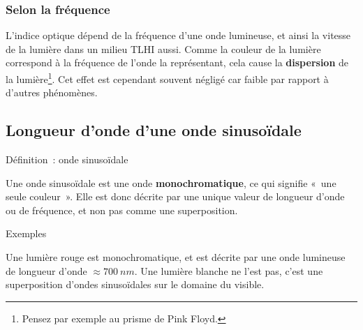 \documentclass[../main/main.tex]{subfiles}
\begin{document}
\subsubsection{Selon la fréquence}

L'indice optique dépend de la fréquence d'une onde lumineuse, et ainsi la
vitesse de la lumière dans un milieu TLHI aussi. Comme la couleur de la lumière
correspond à la fréquence de l'onde la représentant, cela cause la
\textbf{dispersion} de la lumière\footnote{Pensez par exemple au prisme de Pink
Floyd.}. Cet effet est cependant souvent négligé car faible par rapport à
d'autres phénomènes.

\subsection{Longueur d'onde d'une onde sinusoïdale}

\begin{tcbraster}[raster columns=2, raster equal height=rows]
    
    \begin{NCdefi}[]{Définition~: onde sinusoïdale}

        Une onde sinusoïdale est une onde \textbf{monochromatique}, ce qui
        signifie «~une seule couleur~». Elle est donc décrite par une unique
        valeur de longueur d'onde ou de fréquence, et non pas comme une
        superposition.

    \end{NCdefi}
    \begin{NCexem}[]{Exemples}
    
        Une lumière rouge est monochromatique, et est décrite par une onde
        lumineuse de longueur d'onde $\approx \SI{700}{nm}$. Une lumière blanche
        ne l'est pas, c'est une superposition d'ondes sinusoïdales sur le
        domaine du visible.
    
    \end{NCexem}
\end{tcbraster}
\end{document}
